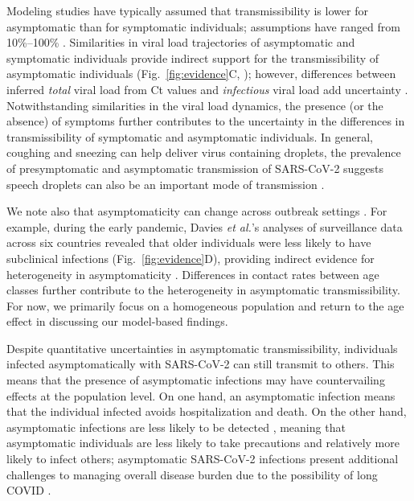 \documentclass[12pt]{article}
\newcommand{\fref}[1]{Fig.~\ref{fig:#1}}
\begin{document}
Modeling studies have typically assumed that transmissibility is lower for asymptomatic than for symptomatic individuals; assumptions have ranged from 10\%--100\% \cite{ferretti2020quantifying,lavezzo2020}.
Similarities in viral load trajectories of asymptomatic and symptomatic individuals provide indirect support for the transmissibility of asymptomatic individuals (\fref{evidence}C, \cite{Kissler2020}); 
however, differences between inferred \emph{total} viral load from Ct values and \emph{infectious} viral load add uncertainty \cite{romero2021ct}.
Notwithstanding similarities in the viral load dynamics, the presence (or the absence) of symptoms further contributes to the uncertainty in the differences in transmissibility of symptomatic and asymptomatic individuals.
In general, coughing and sneezing can help deliver virus containing droplets, the prevalence of presymptomatic and asymptomatic transmission of SARS-CoV-2 suggests speech droplets can also be an important mode of transmission \citep{stadnytskyi2021breathing}.

We note also that asymptomaticity can change across outbreak settings \cite{alene2021magnitude}.
For example, during the early pandemic, Davies \textit{et al.}'s analyses of surveillance data across six countries revealed that older individuals were less likely to have subclinical infections (\fref{evidence}D), providing indirect evidence for heterogeneity in asymptomaticity \cite{davies2020}.
Differences in contact rates between age classes further contribute to the heterogeneity in asymptomatic transmissibility.
For now, we primarily focus on a homogeneous population and return to the age effect in discussing our model-based findings.

Despite quantitative uncertainties in asymptomatic transmissibility, individuals infected asymptomatically with SARS-CoV-2 can still transmit to others. 
This means that the presence of asymptomatic infections may have countervailing effects at the population level. 
On one hand, an asymptomatic infection means that the individual infected avoids hospitalization and death. 
On the other hand, asymptomatic infections are less likely to be detected \cite{fraser2004factors,moghadas2020implications}, meaning that asymptomatic individuals are less likely to take precautions and relatively more likely to infect others;
asymptomatic SARS-CoV-2 infections present additional challenges to managing overall disease burden due to the possibility of long COVID \cite{xie2022long}.
\end{document}
